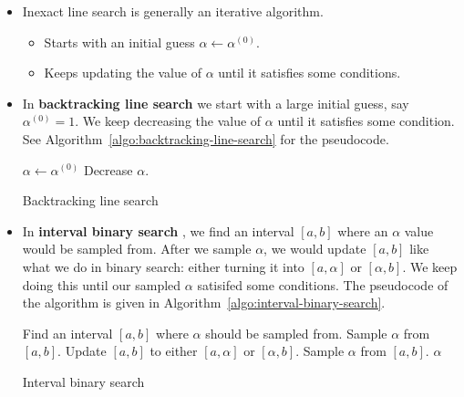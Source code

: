 \documentclass[10pt]{article}
\begin{document}
\begin{itemize}
    \item Inexact line search is generally an iterative algorithm.
    \begin{itemize}
        \item Starts with an initial guess $\alpha \gets \alpha^{(0)}$.
        \item Keeps updating the value of $\alpha$ until it satisfies some conditions.
    \end{itemize}

    \item In {\bf backtracking line search} \cite{Norcedal:2006} we start with a large initial guess, say $\alpha^{(0)} = 1$. We keep decreasing the value of $\alpha$ until it satisfies some condition. See Algorithm~\ref{algo:backtracking-line-search} for the pseudocode.
    
    \begin{algorithm}[t]
    \begin{algorithmic}
        \State $\alpha \gets \alpha^{(0)}$
            \State Decrease $\alpha$.
        \EndWhile        
    \end{algorithmic}    
    \caption{Backtracking line search}
    \label{algo:backtracking-line-search}
    \end{algorithm}

    \item In {\bf interval binary search} \cite{Frandsen:2004}, we find an interval $[a,b]$ where an $\alpha$ value would be sampled from. After we sample $\alpha$, we would update $[a,b]$ like what we do in binary search: either turning it into $[a,\alpha]$ or $[\alpha,b]$. We keep doing this until our sampled $\alpha$ satisifed some conditions. The pseudocode of the algorithm is given in Algorithm~\ref{algo:interval-binary-search}.
        
    \begin{algorithm}[t]
    \begin{algorithmic}
        \State Find an interval $[a,b]$ where $\alpha$ should be sampled from.
        \State Sample $\alpha$ from $[a,b]$.
            \State Update $[a,b]$ to either $[a,\alpha]$ or $[\alpha,b]$.
            \State Sample $\alpha$ from $[a,b]$.
        \EndWhile        
        \State \Return $\alpha$
    \end{algorithmic}
    \caption{Interval binary search}
    \label{algo:interval-binary-search}
    \end{algorithm}
\end{itemize}
\end{document}
